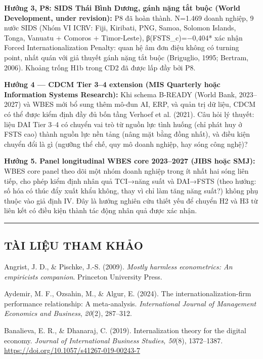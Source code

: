 \documentclass[12pt,a4paper]{article}
\begin{document}
\textbf{Hướng 3, P8: SIDS Thái Bình Dương, gánh nặng tắt buộc (World
Development, under revision):} P8 đã hoàn thành. N=1.469 doanh nghiệp, 9
nước SIDS (Nhóm VI ICRV: Fiji, Kiribati, PNG, Samoa, Solomon Islands,
Tonga, Vanuatu + Comoros + Timor-Leste), β(FSTS\_c)=−0,404* xác nhận
Forced Internationalization Penalty: quan hệ âm đơn điệu không có
turning point, nhất quán với giả thuyết gánh nặng tắt buộc (Briguglio,
1995; Bertram, 2006). Khoảng trống H1b trong CD2 đã được lấp đầy bởi P8.

\textbf{Hướng 4 --- CDCM Tier 3--4 extension (MIS Quarterly hoặc
Information Systems Research):} Khi schema B-READY (World Bank,
2023--2027) và WBES mới bổ sung thêm mô-đun AI, ERP, và quản trị dữ
liệu, CDCM có thể được kiểm định đầy đủ bốn tầng Verhoef et al. (2021).
Câu hỏi lý thuyết: liệu DAI Tier 3--4 có chuyển vai trò từ nguồn lực
tình huống (chỉ phát huy ở FSTS cao) thành nguồn lực nền tảng (nâng mặt
bằng đồng nhất), và điều kiện chuyển đổi là gì (ngưỡng thể chế, quy mô
doanh nghiệp, hay sóng công nghệ)?

\textbf{Hướng 5. Panel longitudinal WBES core 2023--2027 (JIBS hoặc
SMJ):} WBES core panel theo dõi một nhóm doanh nghiệp trong ít nhất hai
sóng liên tiếp, cho phép kiểm định nhân quả TCI→năng suất và DAI→FSTS
(theo hướng: số hóa có thúc đẩy xuất khẩu không, thay vì chỉ làm tăng
năng suất?) không phụ thuộc vào giả định IV. Đây là hướng nghiên cứu
thiết yếu để chuyển H2 và H3 từ liên kết có điều kiện thành tác động
nhân quả được xác nhận.

\begin{center}\rule{0.5\linewidth}{0.5pt}\end{center}

\hypertarget{tuxe0i-liux1ec7u-tham-khux1ea3o}{%
\subsection{TÀI LIỆU THAM KHẢO}\label{tuxe0i-liux1ec7u-tham-khux1ea3o}}

Angrist, J. D., \& Pischke, J.-S. (2009). \emph{Mostly harmless
econometrics: An empiricist\textquotesingle s companion}. Princeton
University Press.

Aydemir, M. F., Ozsahin, M., \& Algur, E. (2024). The
internationalization-firm performance relationship: A meta-analysis.
\emph{International Journal of Management Economics and Business},
\emph{20}(2), 287--312.

Banalieva, E. R., \& Dhanaraj, C. (2019). Internalization theory for the
digital economy. \emph{Journal of International Business Studies,
50}(8), 1372--1387. \url{https://doi.org/10.1057/s41267-019-00243-7}
\end{document}
